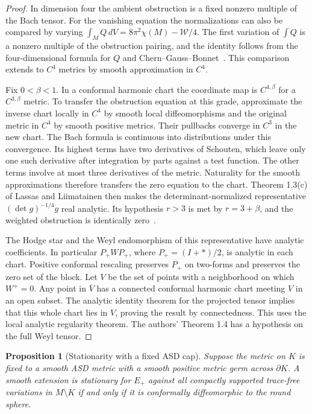 \documentclass[11pt]{article}
\numberwithin{equation}{section}
\newtheorem{proposition}[theorem]{Proposition}
\theoremstyle{definition}
\theoremstyle{remark}
\begin{document}
\begin{proof}
In dimension four the ambient obstruction is a fixed nonzero
multiple of the Bach tensor. For the vanishing equation the
normalizations can also be compared by varying
\(\int_M Q\,dV=8\pi^2\chi(M)-\mathcal W/4\). The first variation of
\(\int Q\) is a nonzero multiple of the obstruction pairing, and
the identity follows from the four-dimensional formula for \(Q\)
and Chern--Gauss--Bonnet~\cite[\S1 and Theorem 1.1]{GrahamHirachi2004Ambient}.
This comparison extends to \(C^4\) metrics by smooth approximation
in \(C^4\).

Fix \(0<\beta<1\). In a conformal harmonic chart the coordinate
map is \(C^{4,\beta}\) for a \(C^{3,\beta}\) metric. To transfer
the obstruction equation at this grade, approximate the inverse
chart locally in \(C^4\) by smooth local diffeomorphisms and the
original metric in \(C^4\) by smooth positive metrics. Their
pullbacks converge in \(C^3\) in the new chart. The Bach formula
is continuous into distributions under this convergence. Its
highest terms have two derivatives of Schouten, which leave
only one such derivative after integration by parts against a
test function. The other terms involve at most three derivatives
of the metric. Naturality for the smooth approximations therefore
transfers the zero equation to the chart. Theorem 1.3(c) of
Lassas and Liimatainen then makes the determinant-normalized
representative \((\det g)^{-1/4}g\) real analytic. Its hypothesis
\(r>3\) is met by \(r=3+\beta\), and the weighted obstruction is
identically zero~\cite[Theorems 1.3(c), 2.2 and 3.7(c), and \S3.2]{LassasLiimatainen2019ConformalHarmonic}.

The Hodge star and the Weyl endomorphism of this representative
have analytic coefficients. In particular \(P_+WP_+\), where
\(P_+=(I+*)/2\), is analytic in each chart. Positive conformal
rescaling preserves \(P_+\) on two-forms and preserves the zero set
of the block. Let \(V\) be the set of points with a neighborhood
on which \(W^+=0\). Any point in \(\overline V\) has a connected
conformal harmonic chart meeting \(V\) in an open subset. The
analytic identity theorem for the projected tensor implies that
this whole chart lies in \(V\), proving the result by connectedness.
This uses the local analytic regularity theorem. The authors'
Theorem 1.4 has a hypothesis on the full Weyl tensor.
\end{proof}

\begin{proposition}[Stationarity with a fixed ASD cap]\label{var:stationarity}
Suppose the metric on \(K\) is fixed to a smooth ASD metric with
a smooth positive metric germ across \(\partial K\).
A smooth extension is stationary for \(E_+\) against all
compactly supported trace-free variations in \(M\setminus K\)
if and only if it is conformally diffeomorphic to the round sphere.
\end{proposition}
\end{document}
